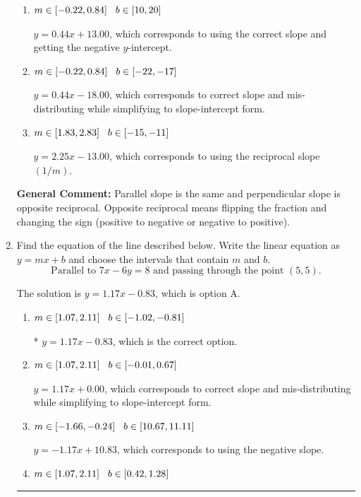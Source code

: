 \documentclass{extbook}[14pt]
\newcommand{\litem}[1]{\item #1

\rule{\textwidth}{0.4pt}}
\begin{document}
\begin{enumerate}
{\begin{enumerate}[label=\Alph*.]
 $y = -0.44x - 5.00$, which corresponds to using the negative slope.
\item \( m \in [-0.22, 0.84] \hspace*{3mm} b \in [10, 20] \)

 $y = 0.44x + 13.00$, which corresponds to using the correct slope and getting the negative $y$-intercept.
\item \( m \in [-0.22, 0.84] \hspace*{3mm} b \in [-22, -17] \)

 $y = 0.44x - 18.00$, which corresponds to correct slope and mis-distributing while simplifying to slope-intercept form.
\item \( m \in [1.83, 2.83] \hspace*{3mm} b \in [-15, -11] \)

 $y = 2.25x - 13.00$, which corresponds to using the reciprocal slope $(1/m)$.
\end{enumerate}

\textbf{General Comment:} Parallel slope is the same and perpendicular slope is opposite reciprocal. Opposite reciprocal means flipping the fraction and changing the sign (positive to negative or negative to positive).
}
\litem{
Find the equation of the line described below. Write the linear equation as $ y=mx+b $ and choose the intervals that contain $m$ and $b$.
\[ \text{Parallel to } 7 x - 6 y = 8 \text{ and passing through the point } (5, 5). \]

The solution is \( y = 1.17x - 0.83 \), which is option A.\begin{enumerate}[label=\Alph*.]
\item \( m \in [1.07, 2.11] \hspace*{3mm} b \in [-1.02, -0.81] \)

* $y = 1.17x - 0.83$, which is the correct option.
\item \( m \in [1.07, 2.11] \hspace*{3mm} b \in [-0.01, 0.67] \)

 $y = 1.17x + 0.00$, which corresponds to correct slope and mis-distributing while simplifying to slope-intercept form.
\item \( m \in [-1.66, -0.24] \hspace*{3mm} b \in [10.67, 11.11] \)

 $y = -1.17x + 10.83$, which corresponds to using the negative slope.
\item \( m \in [1.07, 2.11] \hspace*{3mm} b \in [0.42, 1.28] \)


\end{enumerate}}
\end{enumerate}
\end{document}
